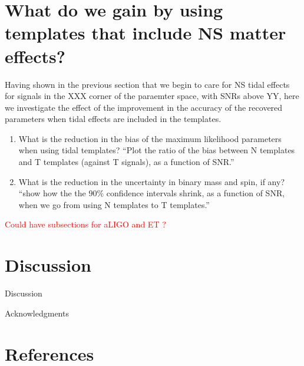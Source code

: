 \documentclass[aps,prd,amsmath,floats,floatfix, twocolumn,
superscriptaddress,nofootinbib,showpacs]{revtex4-1}
\newcommand{\red}{\textcolor{red}}
\begin{document}
\section{What do we gain by using templates that include NS matter effects?}
Having shown in the previous section that we begin to care for NS tidal effects
for signals in the XXX corner of the paraemter space, with SNRs above YY, here
we investigate the effect of the improvement in the accuracy of the recovered
parameters when tidal effects are included in the templates.

\begin{enumerate}
\item What is the reduction in the bias of the maximum likelihood parameters
when using tidal templates?\newline
``Plot the ratio of the bias between N templates and T templates (against T
signals), as a function of SNR.''
\item What is the reduction in the uncertainty in binary mass and spin, if
any?\newline
``show how the the $90\%$ confidence intervals shrink, as a function of SNR, 
when we go from using N templates to T templates.''
\end{enumerate}


\red{Could have subsections for aLIGO and ET ?}


\section{Discussion}
Discussion

\begin{acknowledgments}
Acknowledgments
\end{acknowledgments}

\section*{References}

\end{document}
